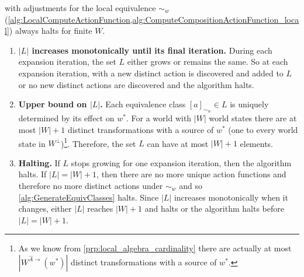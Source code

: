 \begin{propositionE}
     with adjustments for the local equivalence $\sim_{w}$ (\cref{alg:LocalComputeActionFunction,alg:ComputeCompositionActionFunction_local}) always halts for finite $W$.
\end{propositionE}
\begin{proofE}
\begin{enumerate}
    \item \textbf{$|L|$ increases monotonically until its final iteration.}
    During each expansion iteration, the set $L$ either grows or remains the same.
    So at each expansion iteration, with a new distinct action is discovered and added to $L$ or no new distinct actions are discovered and the algorithm halts.

    \item \textbf{Upper bound on $|L|$.}
    Each equivalence class $[a]_{\sim_{w}} \in L$ is uniquely determined by its effect on $w^{*}$.
    For a world with $|W|$ world states there are at most $|W| + 1$ distinct transformations with a source of $w^{*}$ (one to every world state in $W^{\bot}$)\footnote{
    As we know from \cref{prp:local_algebra_cardinality} there are actually at most $|W^{\hat{A}\to}(w^{*})|$ distinct transformations with a source of $w^{*}$.
    }.
    Therefore, the set $L$ can have at most $|W|+1$ elements.

    \item \textbf{Halting.}
    If $L$ stops growing for one expansion iteration, then the algorithm halts.
    If $|L| = |W|+1$, then there are no more unique action functions and therefore no more distinct actions under $\sim_{w}$ and so \cref{alg:GenerateEquivClasses} halts.
    Since $|L|$ increases monotonically when it changes, either $|L|$ reaches $|W|+1$ and halts or the algorithm halts before $|L|=|W|+1$.
\end{enumerate}
\end{proofE}

